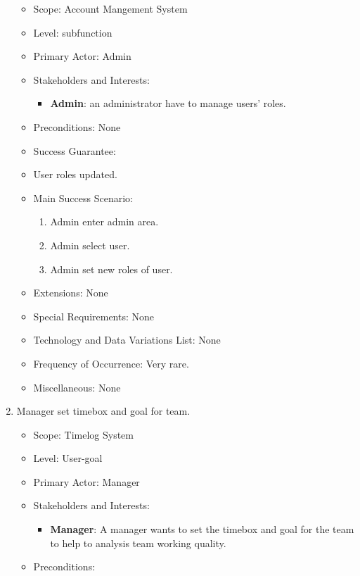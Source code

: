 \documentclass[12pt, a4paper]{article}
\begin{document}
\begin{CJK*}{UTF8}{bkai}
\begin{enumerate}
\begin{itemize}
          \item Scope: Account Mangement System
          \item Level: subfunction
          \item Primary Actor: Admin
          \item Stakeholders and Interests:
            \begin{itemize}
              \item {\bf Admin}: an administrator have to manage users' roles.
            \end{itemize}
          \item Preconditions: None
          \item Success Guarantee:
            \item User roles updated.
          \item Main Success Scenario:
            \begin{enumerate}
              \item Admin enter admin area.
              \item Admin select user.
              \item Admin set new roles of user.
            \end{enumerate}
          \item Extensions: None
          \item Special Requirements: None
          \item Technology and Data Variations List: None
          \item Frequency of Occurrence: Very rare.
          \item Miscellaneous: None
        \end{itemize}
      \item Manager set timebox and goal for team.
        \begin{itemize}
          \item Scope: Timelog System
          \item Level: User-goal
          \item Primary Actor: Manager
          \item Stakeholders and Interests:
            \begin{itemize}
              \item {\bf Manager}: A manager wants to set the timebox and goal for the team to help to analysis team working quality.
            \end{itemize}
          \item Preconditions:

\end{itemize}
\end{enumerate}
\end{CJK*}
\end{document}
